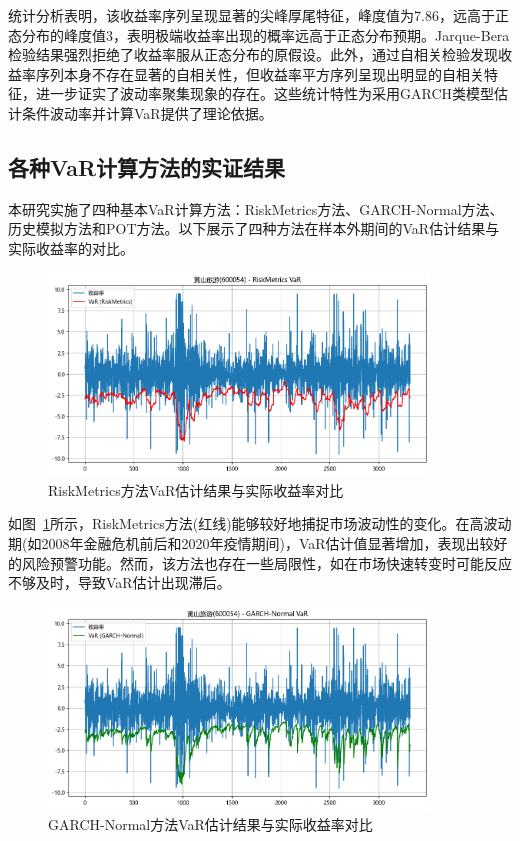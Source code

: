 \documentclass[12pt, a4paper]{article}
\begin{document}
统计分析表明，该收益率序列呈现显著的尖峰厚尾特征，峰度值为7.86，远高于正态分布的峰度值3，表明极端收益率出现的概率远高于正态分布预期。Jarque-Bera检验结果强烈拒绝了收益率服从正态分布的原假设。此外，通过自相关检验发现收益率序列本身不存在显著的自相关性，但收益率平方序列呈现出明显的自相关特征，进一步证实了波动率聚集现象的存在。这些统计特性为采用GARCH类模型估计条件波动率并计算VaR提供了理论依据。

\subsection{各种VaR计算方法的实证结果}

本研究实施了四种基本VaR计算方法：RiskMetrics方法、GARCH-Normal方法、历史模拟方法和POT方法。以下展示了四种方法在样本外期间的VaR估计结果与实际收益率的对比。

\begin{figure}[htbp]
\centering
\includegraphics[width=0.9\textwidth]{./img/var_rm.png}
\caption{RiskMetrics方法VaR估计结果与实际收益率对比}
\label{fig:var_rm}
\end{figure}

如图~\ref{fig:var_rm}所示，RiskMetrics方法(红线)能够较好地捕捉市场波动性的变化。在高波动期(如2008年金融危机前后和2020年疫情期间)，VaR估计值显著增加，表现出较好的风险预警功能。然而，该方法也存在一些局限性，如在市场快速转变时可能反应不够及时，导致VaR估计出现滞后。

\begin{figure}[htbp]
\centering
\includegraphics[width=0.9\textwidth]{./img/var_garch.png}
\caption{GARCH-Normal方法VaR估计结果与实际收益率对比}
\label{fig:var_garch}
\end{figure}
\end{document}
